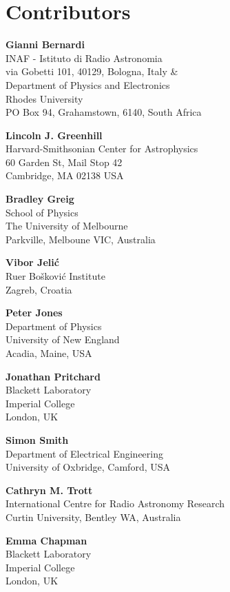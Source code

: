 
\chapter*{Contributors}
 


{\parskip=12pt

\noindent\textbf{Gianni Bernardi}\\
INAF - Istituto di Radio Astronomia\\
via Gobetti 101, 40129, Bologna, Italy \& \\
Department of Physics and Electronics\\
Rhodes University\\
PO Box 94, Grahamstown, 6140, South Africa

\noindent\textbf{Lincoln J. Greenhill}\\
Harvard-Smithsonian Center for Astrophysics\\
60 Garden St, Mail Stop 42\\
Cambridge, MA 02138 USA

\noindent\textbf{Bradley Greig}\\
School of Physics\\
The University of Melbourne\\
Parkville, Melboune VIC, Australia

\noindent\textbf{Vibor Jeli\'c}\\
Ru{\dj}er Bo\v{s}kovi\'{c} Institute\\ 
Zagreb, Croatia 

\noindent\textbf{Peter Jones}\\
Department of Physics\\
University of New England\\
Acadia, Maine, USA

\noindent\textbf{Jonathan Pritchard}\\
Blackett Laboratory\\
Imperial College\\
London, UK

\noindent\textbf{Simon Smith}\\
Department of Electrical Engineering\\
University of Oxbridge, 
Camford, USA

\noindent\textbf{Cathryn M. Trott}\\
International Centre for Radio Astronomy Research\\
Curtin University, Bentley WA, Australia

\noindent\textbf{Emma Chapman}\\
Blackett Laboratory\\
Imperial College\\
London, UK

}
